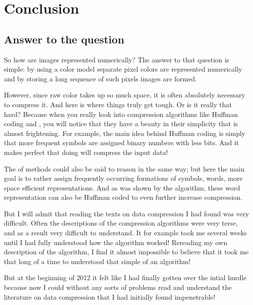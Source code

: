 \begin{comment}
  
\end{comment}

\chapter{Conclusion}
\label{cha:conclus}

\section{Answer to the question}

So how are images represented numerically? The answer to that question
is simple: by using a color model separate pixel colors are
represented numerically and by storing a long sequence of such pixels
images are formed.

However, since raw color takes up so much space, it is often
absolutely necessary to compress it. And here is where things truly
get tough. Or is it really that hard? Because when you really look
into compression algorithms like Huffman coding and \lzw, you will
notice that they have a beauty in their simplicity that is almost
frightening. For example, the main idea behind Huffman coding is
simply that more frequent symbols are assigned binary numbers with
less bits. And it makes perfect that doing will compress the input data!

The \lzfam of methods could also be said to reason in the same way;
but here the main goal is to rather assign frequently occurring
formations of symbols, words, more space efficient
representations. And as was shown by the  algorithm, these
word representation can also be Huffman coded to even further increase
compression.

But I will admit that reading the texts on data compression I had
found was very difficult. Often the descriptions of the compression
algorithms were very terse, and as a result very difficult to
understand. It for example took me several weeks until I had fully
understood how the \lzw algorithm worked! Rereading my own description
of the algorithm, I find it almost impossible to believe that it took
me that long of a time to understood that simple of an algorithm!

But at the beginning of 2012 it felt like I had finally gotten over
the intial hurdle because now I could without any sorts of problems
read and understand the literature on data compression that I had
initially found impenetrable!

